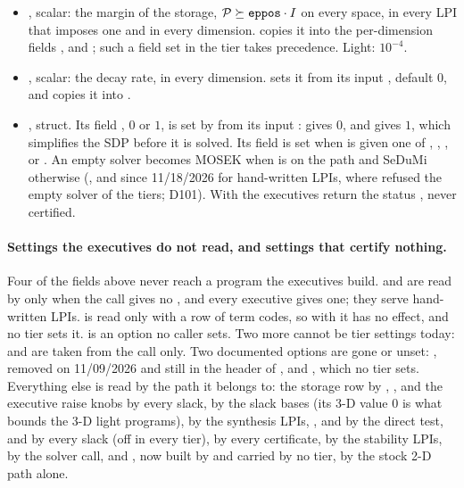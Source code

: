 \begin{itemize}\setlength\itemsep{0pt}
\item {}, scalar: the margin of the storage, $\mathcal{P}\succeq\texttt{eppos}\cdot I$ on every space, in every LPI that imposes one and in every dimension.  copies it into the per-dimension fields ,  and ; such a field set in the tier takes precedence. Light: $10^{-4}$.
\item {}, scalar: the decay rate, in every dimension.  sets it from its input , default $0$, and  copies it into .
\item {}, struct. Its field , $0$ or $1$, is set by  from its input :  gives $0$, and  gives $1$, which simplifies the SDP before it is solved. Its field  is set when  is given one of , , ,  or . An empty solver becomes MOSEK when  is on the path and SeDuMi otherwise (, and since 11/18/2026  for hand-written LPIs, where  refused the empty solver of the tiers; D101). With  the executives return the status , never certified.
\end{itemize}

\paragraph{Settings the executives do not read, and settings that certify nothing.} Four of the fields above never reach a program the executives build.  and  are read by  only when the call gives no , and every executive gives one; they serve hand-written LPIs.  is read only with a row of term codes, so with  it has no effect, and no tier sets it.  is an option no caller sets. Two more cannot be tier settings today:  and  are taken from the call only. Two documented options are gone or unset: , removed on 11/09/2026 and still in the header of , and , which no tier sets. Everything else is read by the path it belongs to: the storage row by , ,  and the executive raise knobs by every slack,  by the slack bases (its 3-D value $0$ is what bounds the 3-D light programs),  by the synthesis LPIs, ,  and  by the direct test,  and  by every slack (off in every tier),  by every certificate,  by the stability LPIs,  by the solver call, and , now built by  and carried by no tier, by the stock 2-D path alone.

